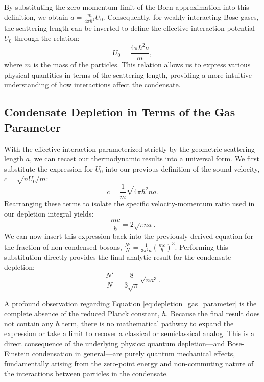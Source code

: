 \begin{example}
    By substituting the zero-momentum limit of the Born approximation into this definition, we obtain \( a = \frac{m}{4\pi\hbar^2} U_0 \). Consequently, for weakly interacting Bose gases, the scattering length can be inverted to define the effective interaction potential \( U_0 \) through the relation:
    \begin{equation} \label{eq:u0_scattering_length}
        U_0 = \frac{4\pi \hbar^2 a}{m},
    \end{equation}
    where \( m \) is the mass of the particles. This relation allows us to express various physical quantities in terms of the scattering length, providing a more intuitive understanding of how interactions affect the condensate.
\end{example}

\subsection{Condensate Depletion in Terms of the Gas Parameter}

With the effective interaction parameterized strictly by the geometric scattering length \( a \), we can recast our thermodynamic results into a universal form. We first substitute the expression for \( U_0 \) into our previous definition of the sound velocity, \( c = \sqrt{n U_0 / m} \):
\[
    c = \frac{1}{m} \sqrt{4\pi\hbar^2 n a}.
\]
Rearranging these terms to isolate the specific velocity-momentum ratio used in our depletion integral yields:
\[
    \frac{mc}{\hbar} = 2\sqrt{\pi n a}.
\]
We can now insert this expression back into the previously derived equation for the fraction of non-condensed bosons, \( \frac{N'}{N} = \frac{1}{3\pi^2 n} \left(\frac{mc}{\hbar}\right)^3 \). Performing this substitution directly provides the final analytic result for the condensate depletion:
\begin{equation} \label{eq:depletion_gas_parameter}
    \frac{N'}{N} = \frac{8}{3\sqrt{\pi}} \sqrt{n a^3}.
\end{equation}

A profound observation regarding Equation \ref{eq:depletion_gas_parameter} is the complete absence of the reduced Planck constant, \( \hbar \). Because the final result does not contain any \( \hbar \) term, there is no mathematical pathway to expand the expression or take a limit to recover a classical or semiclassical analog. This is a direct consequence of the underlying physics: quantum depletion—and Bose-Einstein condensation in general—are purely quantum mechanical effects, fundamentally arising from the zero-point energy and non-commuting nature of the interactions between particles in the condensate.


